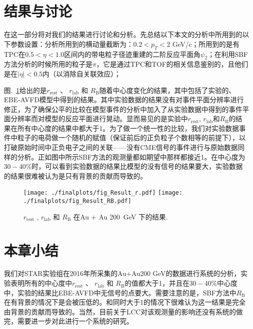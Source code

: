\section{结果与讨论}
\label{AuAuresults}

在这一部分将对我们的结果进行讨论和分析。先总结以下本文的分析中所用到的以下参数设置：分析所用到的横动量截断为：$0.2 < p_T < 2 $ GeV/c；所用到的是有TPC在$ 0.5< \eta <1.0$区间内的带电粒子径迹重建的二阶反应平面角$\psi _{2}$；在利用SBF方法分析的时候所用的粒子是$\pi$，它是通过TPC和TOF的相关信息鉴别的，且他们是在$|\eta| <0.5$内（以消除自关联效应）；

图.~\ref{fig:finalresults}给出的是$r_{\mathrm{rest}}$ 、 $r_{\mathrm{lab}}$  和  $R_{\mathrm{B}}$随着中心度变化的结果，其中包括了实验的、EBE-AVFD模型中得到的结果。其中实验数据的结果没有对事件平面分辨率进行修正，为了确保公平的比较在模型事件的分析中加入了从实验数据中得到的事件平面分辨率而对模型的反应平面进行晃动。显而易见的是实验中$r_{\mathrm{rest}}$, $r_{\mathrm{lab}}$和$R_{\mathrm{B}}$的结果在所有中心度的结果中都大于1。为了做一个统一性的比较，我们对实验数据事件中粒子的电荷做一个随机的赋值（保证前后的正负粒子个数相等的前提下），以打破原始时间中正负电子之间的关联——没有CME信号的事件进行与原始数据同样的分析。正如图中所示SBF方法的观测量都如期望中那样都接近1。在中心度为$30-40\%$时，可以看到实验数据的结果比模型的没有信号的结果要大，实验数据的结果很难被认为是只有背景的贡献而导致的。






\begin{figure}[htbp!]
	\centering
	\texttt{[image: ./finalplots/fig\_Result\_r.pdf]}
	\texttt{[image: ./finalplots/fig\_Result\_RB.pdf]}
	\vspace{-0.7cm}
	\caption{
	 $r_{\mathrm{rest}}$ , $r_{\mathrm{lab}}$  和  $R_{\mathrm{B}}$ 在Au + Au 200~GeV 下的结果.
	}
	\label{fig:finalresults}
\end{figure}



\section{本章小结}

我们对STAR实验组在2016年所采集的Au+Au200 GeV的数据进行系统的分析，实验表明所有的中心度中$r_{\mathrm{rest}}$ 、 $r_{\mathrm{lab}}$  和  $R_{\mathrm{B}}$的值都大于1，并且在$30-40\%$中心度中，实验的结果比EBE-AVFD中无信号的点要大。需要注意的是，SBF方法中$R_{\mathrm{B}}$在有背景的情况下是会被压低的。\rrest 和\rb 同时大于1的情况下很难认为这一结果是完全由背景的贡献而导致的。当然，目前关于LCC对该观测量的影响还没有系统的做完，需要进一步对此进行一个系统的研究。



